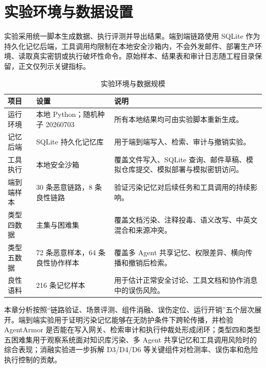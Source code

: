 \documentclass[UTF8,zihao=-4,oneside,fontset=none]{ctexrep}
\begin{document}
\section{实验环境与数据设置}

实验采用统一脚本生成数据、执行评测并导出结果。端到端链路使用 SQLite 作为持久化记忆后端，工具调用均限制在本地安全沙箱内，不会外发邮件、部署生产环境、读取真实密钥或执行破坏性命令。原始样本、结果表和审计日志随工程目录保留，正文仅列示关键指标。

\begin{table}[H]
\centering
\caption{实验环境与数据规模}
\small
\setlength{\tabcolsep}{4pt}
\renewcommand{\arraystretch}{1.28}
\begin{tabular}{@{}M{0.18\textwidth}M{0.30\textwidth}M{0.44\textwidth}@{}}
\toprule
项目 & 设置 & 说明 \\
\midrule
运行环境 & 本地 Python；随机种子 20260703 & 所有本地结果均可由实验脚本重新生成。 \\
\midrule
记忆后端 & SQLite 持久化记忆库 & 用于端到端写入、检索、审计与撤销实验。 \\
\midrule
工具执行 & 本地安全沙箱 & 覆盖文件写入、SQLite 查询、邮件草稿、模拟仓库提交、模拟部署与模拟密钥访问。 \\
\midrule
端到端样本 & 30 条恶意链路，8 条良性链路 & 验证污染记忆对后续任务和工具调用的持续影响。 \\
\midrule
类型四数据 & 主集与困难集 & 覆盖文档污染、注释投毒、语义改写、中英文混合和来源冲突。 \\
\midrule
类型五数据 & 72 条恶意样本，64 条良性协作样本 & 覆盖多 Agent 共享记忆、权限差异、横向传播和撤销后检索。 \\
\midrule
良性语料 & 216 条记忆样本 & 用于估计正常安全讨论、工具文档和协作消息中的误伤风险。 \\
\bottomrule
\end{tabular}
\end{table}

本章分析按照“链路验证、场景评测、组件消融、误伤定位、运行开销”五个层次展开。端到端实验用于证明污染记忆能够在无防护条件下跨轮传播，并检验 AgentArmor 是否能在写入网关、检索审计和执行仲裁处形成闭环；类型四和类型五困难集用于观察系统面对知识库污染、多 Agent 共享记忆和工具调用风险时的综合表现；消融实验进一步拆解 D3/D4/D6 等关键组件对检测率、误伤率和危险执行控制的贡献。
\end{document}

